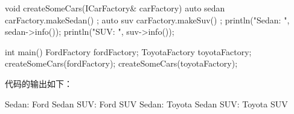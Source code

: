 \begin{cpp}
void createSomeCars(ICarFactory& carFactory)
{
    auto sedan { carFactory.makeSedan() };
    auto suv { carFactory.makeSuv() };
    println("Sedan: {}", sedan->info());
    println("SUV: {}", suv->info());
}

int main()
{
    FordFactory fordFactory;
    ToyotaFactory toyotaFactory;
    createSomeCars(fordFactory);
    createSomeCars(toyotaFactory);
}
\end{cpp}

代码的输出如下：

\begin{shell}
Sedan: Ford Sedan
SUV: Ford SUV
Sedan: Toyota Sedan
SUV: Toyota SUV
\end{shell}
















